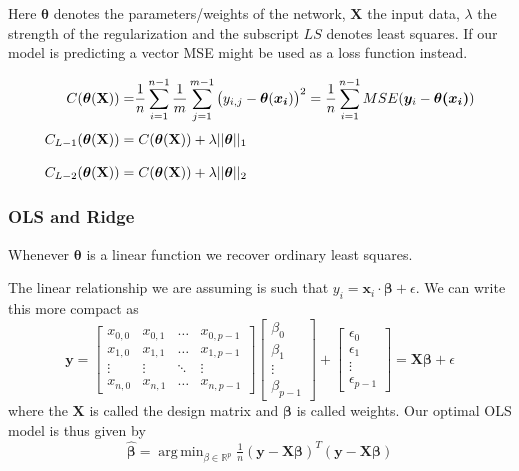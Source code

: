 \documentclass{article}
\theoremstyle{definition}
\DeclareMathOperator*{\argmin}{arg\,min}
\begin{document}
Here $\boldsymbol{\theta}$ denotes the parameters/weights of the network,  $\boldsymbol{X}$  the input data,  $\lambda$ the strength of the regularization and the subscript $LS$ denotes least squares. If our model is predicting a vector MSE might be used as a loss function instead.

\begin{align*}
C (\boldsymbol{\theta}(\mathbf{X})) =& \frac{1}{n} \sum_{i=1}^{n-1} \frac{1}{m}\sum_{j=1}^{m-1} \left(y_{i,j} - \boldsymbol{\theta}(\boldsymbol{x_i})\right)^2 =  \frac{1}{n} \sum_{i=1}^{n-1} MSE(\boldsymbol{y}_i - \boldsymbol{\theta(x_i)}) \\[1mm]
C_{L-1} (\boldsymbol{\theta}(\mathbf{X}))= & \hspace{1mm} C(\boldsymbol{\theta}(\mathbf{X})) + \lambda ||\boldsymbol{\theta}||_1\\[3mm]
C_{L-2} (\boldsymbol{\theta}(\mathbf{X}))= & \hspace{1mm} C(\boldsymbol{\theta}(\mathbf{X})) + \lambda  ||\boldsymbol{\theta}||_2
\end{align*}



\subsubsection{OLS and Ridge}
Whenever $\boldsymbol{\theta}$ is a linear function we recover ordinary least squares.

The linear relationship we are assuming is such that $y_i = \mathbf{x}_i \cdot \bm{\beta} + \epsilon$. We can write this more compact as
\begin{equation*}
    \mathbf{y} =
    \begin{bmatrix}
        x_{0,0} & x_{0,1} & \ldots & x_{0, p-1} \\
        x_{1,0} & x_{1,1} & \ldots & x_{1, p-1} \\
        \vdots & \vdots & \ddots & \vdots \\
        x_{n,0} & x_{n,1} & \ldots & x_{n, p-1}
    \end{bmatrix}
    \begin{bmatrix}
        \beta_0 \\
        \beta_1 \\
        \vdots \\
        \beta_{p-1}
    \end{bmatrix}
    +
    \begin{bmatrix}
        \epsilon_0 \\
        \epsilon_1 \\
        \vdots \\
        \epsilon_{p-1}
    \end{bmatrix}
    = \mathbf{X}\bm{\beta} + \epsilon
\end{equation*}
where the $\mathbf{X}$ is called the design matrix and $\bm{\beta}$ is called weights. Our optimal OLS model is thus given by
\begin{equation*}
    \bm{\hat{\beta}} = \argmin_{\beta \in \mathbb{R}^p}\tfrac{1}{n}(\mathbf{y} - \mathbf{X}\bm{\beta})^T(\mathbf{y} - \mathbf{X}\bm{\beta})
\end{equation*}
\end{document}
